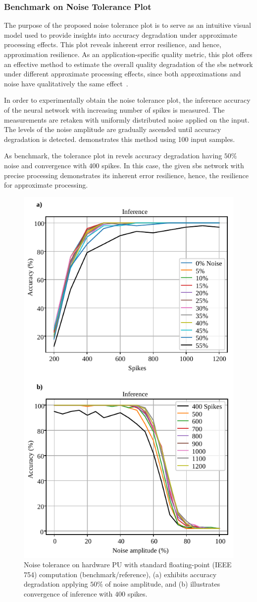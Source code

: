 \subsubsection{Benchmark on Noise Tolerance Plot}
The purpose of the proposed noise tolerance plot is to serve as an intuitive visual model used to provide insights into accuracy degradation under approximate processing effects. This plot reveals inherent error resilience, and hence, approximation resilience. As an application-specific quality metric, this plot offers an effective method to estimate the overall quality degradation of the \gls{sbs} network under different approximate processing effects, since both approximations and noise have qualitatively the same effect~\cite{venkataramani2015approximate}.

In order to experimentally obtain the noise tolerance plot, the inference accuracy of the neural network with increasing number of spikes is measured. The measurements are retaken with uniformly distributed noise applied on the input. The levels of the noise amplitude are gradually ascended until accuracy degradation is detected.  demonstrates this method using 100 input samples.

As benchmark, the tolerance plot in  revels accuracy degradation having $50\%$ noise and convergence with $400$ spikes. In this case, the given \gls{sbs} network with precise processing demonstrates its inherent error resilience, hence, the resilience for approximate processing.


\begin{figure}[b!]
	\centering
	\includegraphics[width=0.5\columnwidth]{./chapters/sbs_accelerator/figures/accuracy_vs_noise_pu_fp.pdf}
	\caption{Noise tolerance on hardware PU with standard floating-point (IEEE 754) computation (benchmark/reference), (a) exhibits accuracy degradation applying $50\%$ of noise amplitude, and (b) illustrates convergence of inference with $400$ spikes.}
	\label{fig:accuracy_vs_noise_pu_fp}
\end{figure}

